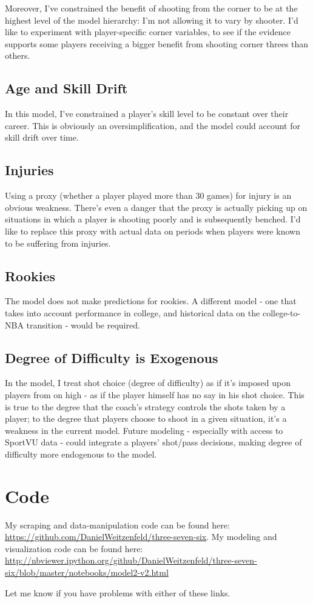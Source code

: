 \documentclass[11pt, oneside]{article}   	%
\begin{document}
Moreover, I've constrained the benefit of shooting from the corner to be at the highest level of the model hierarchy:  I'm not allowing it to vary by shooter.  I'd like to experiment with player-specific corner variables, to see if the evidence supports some players receiving a bigger benefit from shooting corner threes than others.  

\subsection{Age and Skill Drift}
\label{sec:drift}
In this model, I've constrained a player's skill level to be constant over their career.  This is obviously an oversimplification, and the model could account for skill drift over time. 
\subsection{Injuries} 
Using a proxy (whether a player played more than 30 games) for injury is an obvious weakness.  There's even a danger that the proxy is actually picking up on situations in which a player is shooting poorly and is subsequently benched.  I'd like to replace this proxy with actual data on periods when players were known to be suffering from injuries.    
\label{sec:injuries}
\subsection{Rookies} The model does not make predictions for rookies.  A different model - one that takes into account performance in college, and historical data on the college-to-NBA transition - would be required.  
\subsection{Degree of Difficulty is Exogenous} In the model, I treat shot choice (degree of difficulty) as if it's imposed upon players from on high - as if the player himself has no say in his shot choice.  This is true to the degree that the coach's strategy controls the shots taken by a player; to the degree that players choose to shoot in a given situation, it's a weakness in the current model.  Future modeling - especially with access to SportVU data - could integrate a players' shot/pass decisions, making degree of difficulty more endogenous to the model.  

\section{Code}

My scraping and data-manipulation code can be found here: \url{https://github.com/DanielWeitzenfeld/three-seven-six}.  
My modeling and visualization code can be found here: \url{http://nbviewer.ipython.org/github/DanielWeitzenfeld/three-seven-six/blob/master/notebooks/model2-v2.html}

Let me know if you have problems with either of these links.
\end{document}
